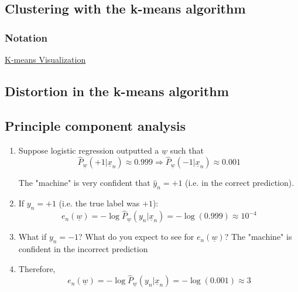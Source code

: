     \subsection{Clustering with the k-means algorithm}
        \subsubsection{Notation}
            \href{http://shabal.in/visuals/kmeans/6.html}{K-means Visualization}


    \subsection{Distortion in the k-means algorithm}

    \subsection{Principle component analysis}



    \begin{example}
        \begin{enumerate}
            \item Suppose logistic regression outputted a \(\underline{w}\) such that 
            \[
            \hat{P}_{\underline{w}}(+1 | \underline{x}_n) \approx 0.999 \Rightarrow \hat{P}_{\underline{w}}(-1 | \underline{x}_n) \approx 0.001
            \]

            The "machine" is very confident that \(\hat{y}_n = +1\) (i.e. in the correct prediction).
        
            \item If \( y_n = +1 \) (i.e. the true label was \(+1\)):
            \[
            e_n(\underline{w}) = -\log \hat{P}_{\underline{w}}(y_n | \underline{x}_n) = -\log(0.999) \approx 10^{-4}
            \]
            
            \item What if \( y_n = -1 \)? What do you expect to see for \( e_n(\underline{w}) \)?
            The "machine" is confident in the incorrect prediction

            \item Therefore,
            \[
            e_n(\underline{w}) = -\log \hat{P}_{\underline{w}}(y_n | \underline{x}_n) = -\log(0.001) \approx 3
            \]
        \end{enumerate}        
    \end{example}
